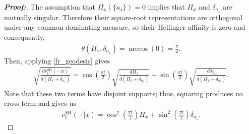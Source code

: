 \documentclass[11pt,twoside]{article}
\theoremstyle{definition}
\theoremstyle{remark}
\begin{document}
\begin{proof}[\textbf{Proof:}]

The assumption that $\Pi_x(\{a_\star\})=0$ implies that $\Pi_x$ and $\delta_{a_\star}$ are mutually singular. Therefore their
square-root representations are orthogonal under any common
dominating measure, so their Hellinger affinity is zero and consequently,
\begin{align*}
     \theta(\Pi_x,\delta_{a_\star}) = \arccos(0) = \frac{\pi}{2}.
\end{align*}
Then, applying \cref{fr_geodesic} gives
\begin{align*}
     \sqrt{\frac{ d\nu_t^{\mathrm{SH}}(\,\cdot\mid x)}{d(\Pi_x+\delta_{a_\star})}} = \cos\left(\frac{\pi t}{2}\right) \sqrt{\frac{d\Pi_x}{d(\Pi_x+\delta_{a_\star})}} + \sin\left(\frac{\pi t}{2}\right) \sqrt{\frac{d\delta_{a_\star}}{d(\Pi_x+\delta_{a_\star})}}.
\end{align*}
Note that these two terms have disjoint supports; thus, squaring produces no cross term and gives us
\begin{align*}
    \nu_t^{\mathrm{SH}}(\,\cdot\mid x) = \cos^2\left(\frac{\pi t}{2}\right)\Pi_x + \sin^2\left(\frac{\pi t}{2}\right)\delta_{a_\star}.
\end{align*}
\end{proof}
\end{document}
